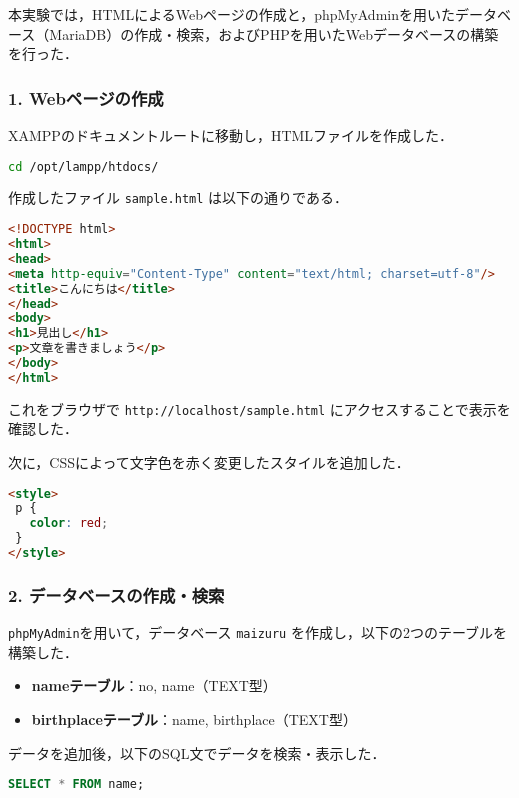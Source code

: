 本実験では，HTMLによるWebページの作成と，phpMyAdminを用いたデータベース（MariaDB）の作成・検索，およびPHPを用いたWebデータベースの構築を行った．

\subsubsection*{1. Webページの作成}

XAMPPのドキュメントルートに移動し，HTMLファイルを作成した．

\begin{lstlisting}[language=bash]
cd /opt/lampp/htdocs/
\end{lstlisting}

作成したファイル \texttt{sample.html} は以下の通りである．

\begin{lstlisting}[language=html]
<!DOCTYPE html>
<html>
<head>
<meta http-equiv="Content-Type" content="text/html; charset=utf-8"/>
<title>こんにちは</title>
</head>
<body>
<h1>見出し</h1>
<p>文章を書きましょう</p>
</body>
</html>
\end{lstlisting}

これをブラウザで \texttt{http://localhost/sample.html} にアクセスすることで表示を確認した．

次に，CSSによって文字色を赤く変更したスタイルを追加した．

\begin{lstlisting}[language=html]
<style>
 p {
   color: red;
 }
</style>
\end{lstlisting}

\subsubsection*{2. データベースの作成・検索}

\texttt{phpMyAdmin}を用いて，データベース \texttt{maizuru} を作成し，以下の2つのテーブルを構築した．

\vspace{0.5zh}
\begin{itemize}
  \item \textbf{nameテーブル}：no, name（TEXT型）
  \item \textbf{birthplaceテーブル}：name, birthplace（TEXT型）
\end{itemize}

データを追加後，以下のSQL文でデータを検索・表示した．

\begin{lstlisting}[language=SQL]
SELECT * FROM name;
\end{lstlisting}

